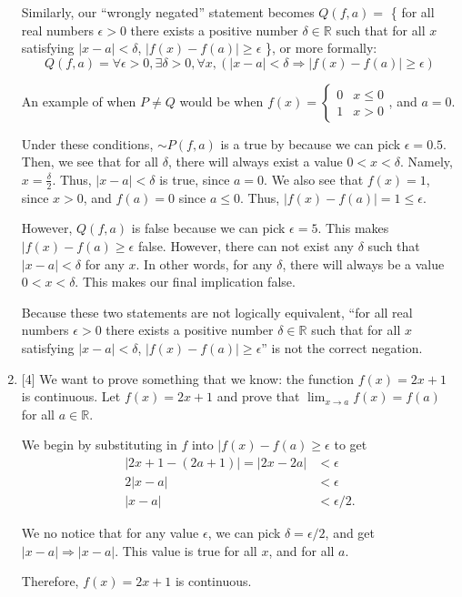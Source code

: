 \documentclass{article}
\begin{document}
\begin{enumerate}
{        Similarly, our ``wrongly negated'' statement becomes \(Q(f, a) = \) \{
            for all real numbers \(\epsilon > 0\) there exists a 
            positive number \(\delta \in \mathbb{R}\) such that for all \(x\) satisfying
            \(|x - a| < \delta\), \(|f(x) - f(a)| \ge \epsilon\)
        \}, or more formally:
        \[Q(f, a) = \forall \epsilon > 0, \exists \delta > 0, \forall x, (|x - a| < \delta \Rightarrow |f(x) - f(a)| \ge \epsilon)\]

        An example of when \(P \not= Q\) would be when
        \(
        f(x) = 
        \begin{cases}
            0 & x \le 0\\
            1 & x > 0
        \end{cases}
        \), and \(a = 0\).

        Under these conditions, \(\sim P(f, a)\) is a true by because we can pick 
        \(\epsilon = 0.5\). Then, we see that for all \(\delta\), there will always 
        exist a value \(0 < x < \delta\). Namely, \(x = \frac{\delta}{2}\). Thus, 
        \(|x - a| < \delta\) is true, since \(a = 0\). 
        We also see that \(f(x) = 1\), since \(x > 0\), and \(f(a) = 0\) since \(a \le 0\). 
        Thus, \(|f(x) - f(a)| = 1 \le \epsilon\). 

        However, \(Q(f, a)\) is false because we can pick \(\epsilon = 5\). This 
        makes \(|f(x) - f(a) \ge \epsilon\) false. However, there can not exist 
        any \(\delta\) such that \(|x - a| < \delta\) for any \(x\). In other words,
        for any \(\delta\), there will always be a value \(0 < x < \delta\). This 
        makes our final implication false. 

        Because these two statements are not logically equivalent, 
        ``for all real numbers \(\epsilon > 0\) there exists a 
        positive number \(\delta \in \mathbb{R}\) such that for all \(x\) satisfying
        \(|x - a| < \delta\), \(|f(x) - f(a)| \ge \epsilon\)'' is not the correct 
        negation. 
    }

    \item {
        [4] We want to prove something that we know: the function \(f(x) = 2x+1\) 
        is continuous. Let \(f(x) = 2x+1\) and prove that \(\displaystyle \lim_{x \to a} f(x) = f(a)\)
        for all \(a \in \mathbb{R}\).

        We begin by substituting in \(f\) into \(|f(x) - f(a) \ge \epsilon\)
        to get 
        \begin{align*}
            |2x + 1 - (2a + 1)| = |2x - 2a| &< \epsilon\\
            2|x - a| &< \epsilon \\
            |x - a| &< \epsilon / 2.
        \end{align*}

        We no notice that for any value \(\epsilon\), we can pick \(\delta = \epsilon / 2\),
        and get \(|x - a| \Rightarrow |x - a|\). This value is true for all \(x\), 
        and for all \(a\). 

        Therefore, \(f(x) = 2x + 1\) is continuous.
    }
\end{enumerate}



\end{document}
